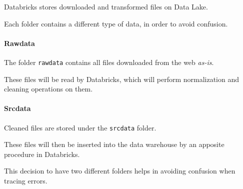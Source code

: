 Databricks stores downloaded and transformed files on Data Lake.

Each folder contains a different type of data, in order to avoid confusion.

\paragraph{Rawdata}
    The folder \texttt{rawdata} contains all files downloaded from the web \textit{as-is}.
    
    These files will be read by Databricks, which will perform normalization and cleaning operations on them.

\paragraph{Srcdata}
    Cleaned files are stored under the \texttt{srcdata} folder.
    
    These files will then be inserted into the data warehouse by an apposite procedure in Databricks.\newline
    
This decision to have two different folders helps in avoiding confusion when tracing errors.
